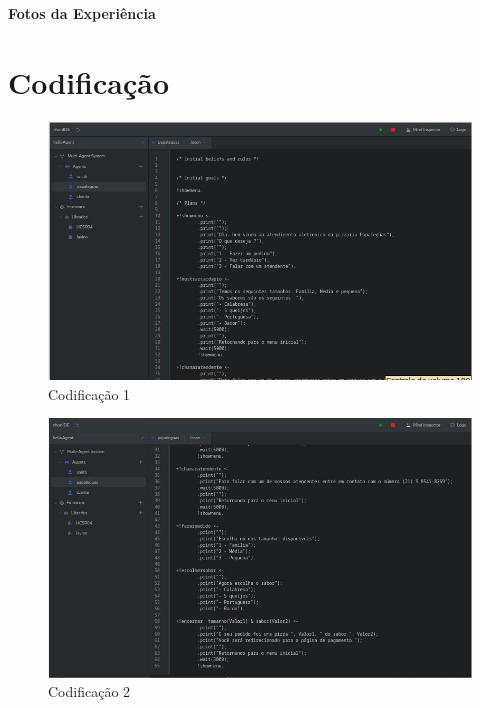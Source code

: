 \documentclass[12pt]{article}
\begin{document}
    \vspace{10mm} 
    \begin{center} 
    \Large 
    \textbf{Fotos da Experiência} 
    \end{center} 

    \vspace{10mm} 
    \setcounter{section}{0}

    \section{Codificação}

    
    \begin{figure}[!ht]
        \centering
        \includegraphics[width=1\textwidth]{figures/imagem05.jpeg}
        \caption{Codificação 1}
        \label{fig:imagem5}
    \end{figure}

    \begin{figure}[!ht]
        \centering
        \includegraphics[width=1\textwidth]{figures/imagem06.jpeg}
        \caption{Codificação 2}
        \label{fig:imagem6}
    \end{figure}
\end{document}
